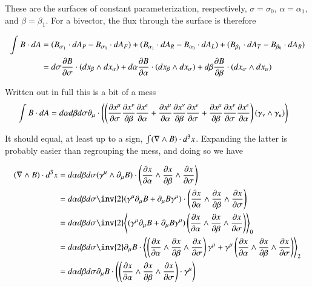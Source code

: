 These are the surfaces of constant parameterization, respectively, $\sigma = \sigma_0$, $\alpha = \alpha_1$, and $\beta = \beta_1$.  For a bivector, the flux through the surface is therefore

\begin{align*}
\int B \cdot dA 
&=
(B_{\sigma_1} \cdot dA_P - B_{\sigma_0} \cdot dA_F )
+ (B_{\alpha_1} \cdot dA_R - B_{\alpha_0} \cdot dA_L)
+ (B_{\beta_1} \cdot dA_T - B_{\beta_0} \cdot dA_B) \\
&=
d \sigma \frac{\partial {B}}{\partial {\sigma}} \cdot (dx_\beta \wedge dx_\alpha )
+ d \alpha \frac{\partial {B}}{\partial {\alpha}} \cdot (dx_\beta \wedge dx_\sigma) 
+ d \beta \frac{\partial {B}}{\partial {\beta}} \cdot (dx_\sigma \wedge dx_\alpha ) \\
\end{align*}

Written out in full this is a bit of a mess
\begin{align}\label{eqn:mess}
\int B \cdot dA 
&=
d \alpha d\beta d\sigma 
\partial_\mu \cdot
\left(
\left(
  \frac{\partial {x^\mu}}{\partial {\sigma}} \frac{\partial {x^\nu}}{\partial {\beta}} \frac{\partial {x^\epsilon}}{\partial {\alpha}} 
+ \frac{\partial {x^\mu}}{\partial {\alpha}} \frac{\partial {x^\nu}}{\partial {\beta}} \frac{\partial {x^\epsilon}}{\partial {\sigma}} 
+ \frac{\partial {x^\mu}}{\partial {\beta}} \frac{\partial {x^\nu}}{\partial {\sigma}} \frac{\partial {x^\epsilon}}{\partial {\alpha}} 
\right) 
(\gamma_\nu \wedge \gamma_\epsilon )
\right) 
\end{align}

It should equal, at least up to a sign, $\int (\nabla \wedge B) \cdot d^3 x$.  Expanding the latter is probably easier than regrouping the mess, and doing so we have

\begin{align*}
(\grad \wedge B) \cdot d^3 x
&=
d\alpha d\beta d\sigma ( \gamma^\mu \wedge \partial_\mu B)  \cdot \left( \PD{\alpha}{x} \wedge \PD{\beta}{x} \wedge \PD{\sigma}{x} \right) \\
&= 
d\alpha d\beta d\sigma \inv{2} ( \gamma^\mu \partial_\mu B + \partial_\mu B \gamma^\mu )  \cdot \left( \PD{\alpha}{x} \wedge \PD{\beta}{x} \wedge \PD{\sigma}{x} \right) \\
&=
d\alpha d\beta d\sigma \inv{2} \gpgradezero{
( \gamma^\mu \partial_\mu B + \partial_\mu B \gamma^\mu )  \left( \PD{\alpha}{x} \wedge \PD{\beta}{x} \wedge \PD{\sigma}{x} \right) }
\\
&=
d\alpha d\beta d\sigma \inv{2} 
\partial_\mu B \cdot
\gpgradetwo{
\left( \PD{\alpha}{x} \wedge \PD{\beta}{x} \wedge \PD{\sigma}{x} \right) \gamma^\mu 
+ \gamma^\mu \left( \PD{\alpha}{x} \wedge \PD{\beta}{x} \wedge \PD{\sigma}{x} \right) }
\\
&=
d\alpha d\beta d\sigma 
\partial_\mu B \cdot
\left( \left( \PD{\alpha}{x} \wedge \PD{\beta}{x} \wedge \PD{\sigma}{x} \right) \cdot \gamma^\mu \right)
\\
\end{align*}

